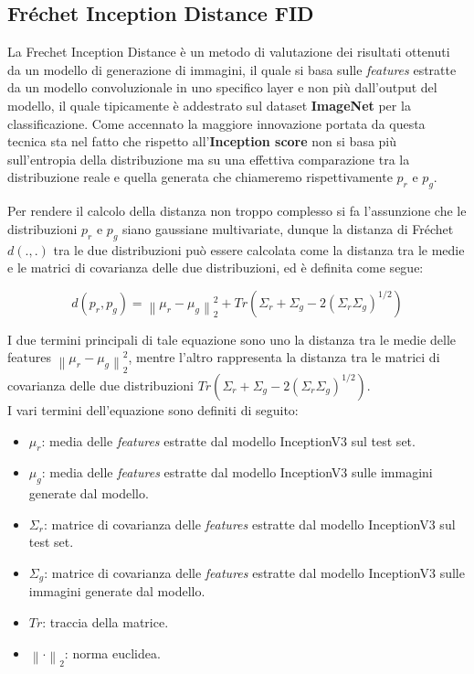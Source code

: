 \subsection{Fréchet Inception Distance FID}
La Frechet Inception Distance è un metodo di valutazione dei risultati ottenuti da un modello di generazione di immagini, il quale si basa sulle \textit{features} estratte
da un modello convoluzionale in uno specifico layer e non più dall'output del modello, il quale tipicamente è addestrato sul dataset \textbf{ImageNet} per la classificazione.
Come accennato la maggiore innovazione portata da questa tecnica sta nel fatto che rispetto all'\textbf{Inception score} non si basa più sull'entropia della distribuzione
ma su una effettiva comparazione tra la distribuzione reale e quella generata che chiameremo rispettivamente $p_r$ e $p_g$.

Per rendere il calcolo della distanza non troppo complesso si fa l'assunzione che le distribuzioni $p_r$ e $p_g$ siano gaussiane multivariate, dunque
la distanza di Fréchet $d(.,.)$ tra le due distribuzioni può essere calcolata come la distanza tra le medie e le matrici di covarianza delle due distribuzioni,
ed è definita come segue:

\begin{equation}
    d(p_r, p_g) = \left \| \mu_r - \mu_g \right \|_2^2 + Tr(\Sigma_r + \Sigma_g - 2(\Sigma_r\Sigma_g)^{1/2})
\end{equation}

I due termini principali di tale equazione sono uno la distanza tra le medie delle features $\left \| \mu_r - \mu_g \right \|_2^2$, mentre l'altro
rappresenta la distanza tra le matrici di covarianza delle due distribuzioni $Tr(\Sigma_r + \Sigma_g - 2(\Sigma_r\Sigma_g)^{1/2})$.\\
I vari termini dell'equazione sono definiti di seguito:

\begin{itemize}
    \item \textbf{$\mu_r$}: media delle \textit{features} estratte dal modello InceptionV3 sul test set.
    \item \textbf{$\mu_g$}: media delle \textit{features} estratte dal modello InceptionV3 sulle immagini generate dal modello.
    \item \textbf{$\Sigma_r$}: matrice di covarianza delle \textit{features} estratte dal modello InceptionV3 sul test set.
    \item \textbf{$\Sigma_g$}: matrice di covarianza delle \textit{features} estratte dal modello InceptionV3 sulle immagini generate dal modello.
    \item \textbf{$Tr$}: traccia della matrice.
    \item \textbf{$\left \| \cdot \right \|_2$}: norma euclidea.
\end{itemize}

